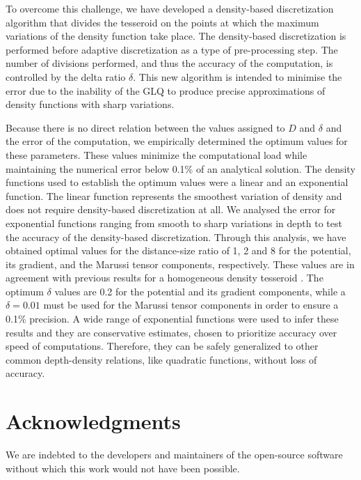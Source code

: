 \documentclass[extra, referee]{gji}
\begin{document}
To overcome this challenge, we have developed a density-based discretization algorithm
that divides the tesseroid on the points at which the maximum variations of the density
function take place.
The density-based discretization is performed before adaptive discretization as a type
of pre-processing step.
The number of divisions performed, and thus the accuracy of the computation, is
controlled by the delta ratio $\delta$.
This new algorithm is intended to minimise the error due to the inability of
the GLQ to produce precise approximations of density functions with sharp variations.

Because there is no direct relation between the values assigned to $D$ and $\delta$ and
the error of the computation, we empirically determined the optimum values for these
parameters.
These values minimize the computational load while maintaining the numerical error below
0.1\% of an analytical solution.
The density functions used to establish the optimum values were a linear and an
exponential function.
The linear function represents the smoothest variation of density and does not require
density-based discretization at all.
We analysed the error for exponential functions ranging from smooth to sharp variations
in depth to test the accuracy of the density-based discretization.
Through this analysis, we have obtained optimal values for the distance-size ratio of
1, 2 and 8 for the potential, its gradient, and the Marussi tensor components,
respectively.
These values are in agreement with previous results for a homogeneous density tesseroid
\citep{Uieda2016}.
The optimum $\delta$ values are 0.2 for the potential and its gradient components, while
a $\delta = 0.01$ must be used for the Marussi tensor components in order to ensure a
0.1\% precision.
A wide range of exponential functions were used to infer these results and they are
conservative estimates, chosen to prioritize accuracy over speed of computations.
Therefore, they can be safely generalized to other common depth-density relations, like
quadratic functions, without loss of accuracy.




\section{Acknowledgments}

We are indebted to the developers and maintainers of the open-source software without
which this work would not have been possible.
\end{document}
